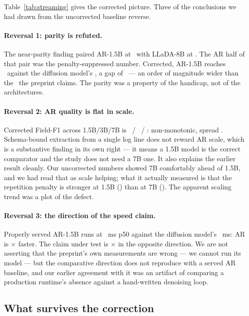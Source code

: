 Table~\ref{tab:streaming} gives the corrected picture. Three of the conclusions
we had drawn from the uncorrected baseline reverse.

\paragraph{Reversal 1: parity is refuted.}
The near-parity finding paired AR-1.5B at \arOneFiveFOneBefore\ with LLaDA-8B at
\mdmFOne. The AR half of that pair was the penalty-suppressed number. Corrected,
AR-1.5B reaches \arOneFiveFOneAfter\ against the diffusion model's \mdmFOne, a
gap of \parityGap\ --- an order of magnitude wider than the \paperParityGap\ the
preprint claims. The parity was a property of the handicap, not of the
architectures.

\paragraph{Reversal 2: AR quality is flat in scale.}
Corrected Field-F1 across 1.5B/3B/7B is \arOneFiveFOneAfter\ /
\arThreeFOne\ / \arSevenFOne: non-monotonic, spread \arScaleSpread. Schema-bound
extraction from a single log line does not reward AR scale, which is a
substantive finding in its own right --- it means a 1.5B model is the correct
comparator and the study does not need a 7B one. It also explains the earlier
result cleanly. Our uncorrected numbers showed 7B comfortably ahead of 1.5B, and
we had read that as scale helping; what it actually measured is that the
repetition penalty is stronger at 1.5B (\repPenaltySmall) than at 7B
(\repPenaltyLarge). The apparent scaling trend was a plot of the defect.

\paragraph{Reversal 3: the direction of the speed claim.}
Properly served AR-1.5B runs at \arOneFivePFiftyVLLM~ms p50 against the
diffusion model's \mdmPFifty~ms: AR is \arSpeedupOverMDM$\times$ faster. The
claim under test is \paperClaimedSpeedup$\times$ in the opposite direction. We
are not asserting that the preprint's own measurements are wrong --- we cannot
run its model --- but the comparative direction does not reproduce with a served
AR baseline, and our earlier agreement with it was an artifact of comparing a
production runtime's absence against a hand-written denoising loop.

\subsection{What survives the correction}


